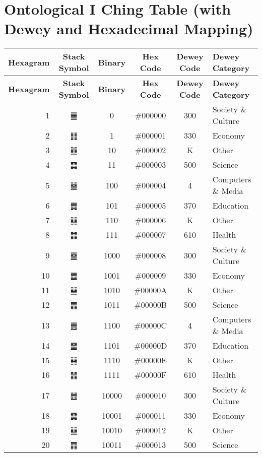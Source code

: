 \documentclass{article}
\begin{document}
\section*{Ontological I Ching Table (with Dewey and Hexadecimal Mapping)}

\renewcommand{\arraystretch}{1.2}

\begin{longtable}{|r|c|c|c|c|l|}
\hline
\textbf{Hexagram} & \textbf{Stack Symbol} & \textbf{Binary} & \textbf{Hex Code} & \textbf{Dewey Code} & \textbf{Dewey Category} \\
\hline
\endfirsthead
\hline
\textbf{Hexagram} & \textbf{Stack Symbol} & \textbf{Binary} & \textbf{Hex Code} & \textbf{Dewey Code} & \textbf{Dewey Category} \\
\hline
\endhead
1  & ䷀ & 0       & \#000000 & 300 & Society \& Culture \\
2  & ䷁ & 1       & \#000001 & 330 & Economy \\
3  & ䷂ & 10      & \#000002 & K   & Other \\
4  & ䷃ & 11      & \#000003 & 500 & Science \\
5  & ䷄ & 100     & \#000004 & 4   & Computers \& Media \\
6  & ䷅ & 101     & \#000005 & 370 & Education \\
7  & ䷆ & 110     & \#000006 & K   & Other \\
8  & ䷇ & 111     & \#000007 & 610 & Health \\
9  & ䷈ & 1000    & \#000008 & 300 & Society \& Culture \\
10 & ䷉ & 1001    & \#000009 & 330 & Economy \\
11 & ䷊ & 1010    & \#00000A & K   & Other \\
12 & ䷋ & 1011    & \#00000B & 500 & Science \\
13 & ䷌ & 1100    & \#00000C & 4   & Computers \& Media \\
14 & ䷍ & 1101    & \#00000D & 370 & Education \\
15 & ䷎ & 1110    & \#00000E & K   & Other \\
16 & ䷏ & 1111    & \#00000F & 610 & Health \\
17 & ䷐ & 10000   & \#000010 & 300 & Society \& Culture \\
18 & ䷑ & 10001   & \#000011 & 330 & Economy \\
19 & ䷒ & 10010   & \#000012 & K   & Other \\
20 & ䷓ & 10011   & \#000013 & 500 & Science \\

\end{longtable}
\end{document}
